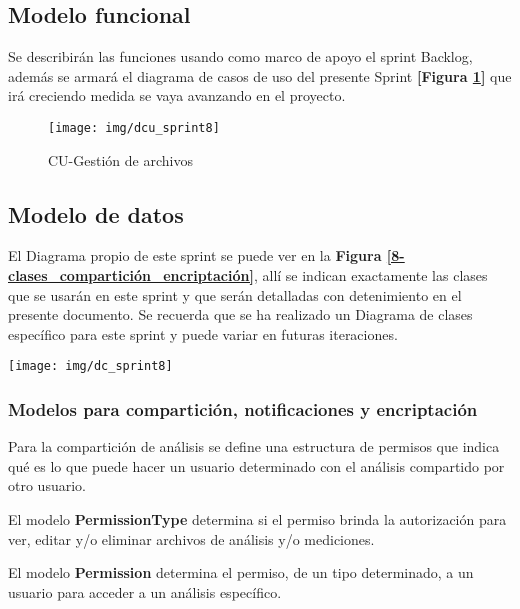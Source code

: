 \subsection{Modelo funcional} 
Se describirán las funciones usando como marco de apoyo el sprint Backlog, además se armará el diagrama de casos de uso del presente Sprint \textbf{[Figura \ref{8-cu_compartición_encriptación}]} que irá creciendo  medida se vaya avanzando en el proyecto.

    \begin{figure}[h]
        \centering
        \texttt{[image: img/dcu\_sprint8]}
        \caption{CU-Gestión de archivos}
		\label{8-cu_compartición_encriptación}
    \end{figure}


\subsection{Modelo de datos}
El Diagrama propio de este sprint se puede ver en la \textbf{Figura \ref{8-clases_compartición_encriptación}}, allí se indican exactamente las clases que se usarán en este sprint y que serán detalladas con detenimiento en el presente documento. Se recuerda que se ha realizado un Diagrama de clases específico para este sprint y puede variar en futuras iteraciones.

    \begin{sidewaysfigure}[h]
        \centering
        \texttt{[image: img/dc\_sprint8]}
        \caption{Clases para compartición de archivos y encriptación.}
		\label{8-clases_compartición_encriptación}
    \end{sidewaysfigure}

\subsubsection{Modelos para compartición, notificaciones y encriptación}

Para la compartición de análisis se define una estructura de permisos que indica qué es lo que puede hacer un usuario determinado con el análisis compartido por otro usuario.

El modelo \textbf{PermissionType} determina si el permiso brinda la autorización para ver, editar y/o eliminar archivos de análisis y/o mediciones.

El modelo \textbf{Permission} determina el permiso, de un tipo determinado, a un usuario para acceder a un análisis específico.

